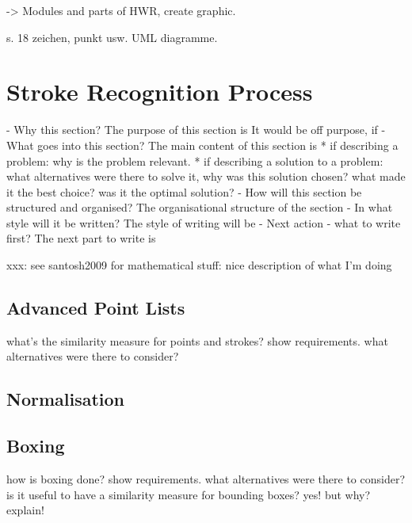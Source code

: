 -> Modules and parts of HWR, create graphic.

s. 18 zeichen, punkt usw. UML diagramme.


\section{Stroke Recognition Process}
\label{sec:hwre:strokerecognitionprocess}

- Why this section? 
  The purpose of this section is 
  It would be off purpose, if 
- What goes into this section?
  The main content of this section is 
  * if describing a problem: why is the problem relevant.
  * if describing a solution to a problem: what alternatives were
    there to solve it, why was this solution chosen? 
    what made it the best choice? was it the optimal solution?
- How will this section be structured and organised?
  The organisational structure of the section 
- In what style will it be written?
  The style of writing will be 
- Next action - what to write first?
  The next part to write is

xxx: see santosh2009 for mathematical stuff: nice description of what I'm doing


\subsection{Advanced Point Lists}
\label{sec:hwre:advancedpointlists}



what's the similarity measure for
points and strokes?
show requirements.
what alternatives were there to consider?

\subsection{Normalisation}
\label{sec:hwre:normalisation}


\subsection{Boxing}
\label{sec:hwre:boxing}
how is boxing done?
show requirements.
what alternatives were there to consider?
is it useful to have a similarity measure for bounding boxes?
yes! but why? explain!



